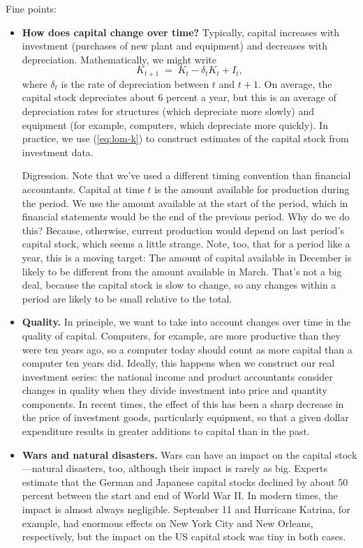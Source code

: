 Fine points:
\begin{itemize}
\item \textbf{How does capital change over time?}
Typically, capital increases with investment (purchases of new plant and equipment)
and decreases with depreciation.
Mathematically, we might write
\begin{equation}
    K_{t+1} \;=\; K_{t} - \delta_t K_{t} + I_{t} ,
    \label{eq:lom-k}
\end{equation}
where $\delta_t$ is the rate of depreciation between $t$ and $t+1$.
On average, the capital stock depreciates about 6 percent a year,
but this is an average of depreciation rates for structures
(which depreciate more slowly) and equipment
(for example, computers, which depreciate more quickly).
In practice, we use (\ref{eq:lom-k}) to construct
estimates of the capital stock from investment data.

Digression.
{\footnotesize
 Note that we've used a different timing convention
than financial accountants.
Capital at time $t$ is the amount available for production
during the period.
We use the amount available at the start of the period,
which in financial statements would be the end of the previous
period.
Why do we do this?  Because, otherwise,
current production would depend on last period's
capital stock, which seems a little strange.
Note, too, that for a period like a year, this is a moving target:
The amount of capital available in December is likely to
be different from the amount available in March.
That's not a big deal, because the capital stock is slow to change,
so any changes within a period are likely to be small relative to the total.}

\item \textbf{Quality.}
In principle, we want to take into account changes over time
in the quality of capital.
Computers, for example, are more productive than they were
ten years ago, so a computer today should count as more capital
than a computer ten years did.
Ideally, this happens when we construct our real investment series:
the national income and product accountants consider changes
in quality when they divide investment into price and quantity components.
In recent times, the effect of this has been a sharp decrease
in the price of investment goods,
particularly equipment,
so that a given dollar expenditure
results in greater additions to capital than in the past.


\item \textbf{Wars and natural disasters.}
Wars can have an impact on the capital stock---natural disasters, too,
although their impact is rarely as big.
Experts estimate that the German and Japanese capital stocks declined
by about 50 percent  between the start and end of World War II.
In modern times, the impact is almost always negligible.
September 11 and Hurricane Katrina, for example, had
enormous effects on New York City and New Orleans, respectively,
but the impact on the US capital stock was tiny in both cases.


\end{itemize}

